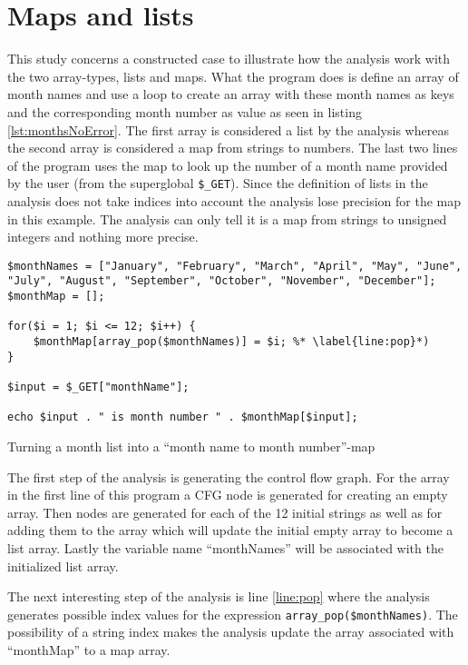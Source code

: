 \section{Maps and lists}
This study concerns a constructed case to illustrate how the analysis work with the two array-types, lists and maps. What the program does is define an array of month names and use a loop to create an array with these month names as keys and the corresponding month number as value as seen in listing \ref{lst:monthsNoError}. The first array is considered a list by the analysis whereas the second array is considered a map from strings to numbers. The last two lines of the program uses the map to look up the number of a month name provided by the user (from the superglobal \texttt{\$\_GET}). Since the definition of lists in the analysis does not take indices into account the analysis lose precision for the map in this example. The analysis can only tell it is a map from strings to unsigned integers and nothing more precise.

\begin{program}
\begin{lstlisting}
$monthNames = ["January", "February", "March", "April", "May", "June", "July", "August", "September", "October", "November", "December"];
$monthMap = [];

for($i = 1; $i <= 12; $i++) {
	$monthMap[array_pop($monthNames)] = $i; %* \label{line:pop}*)
}

$input = $_GET["monthName"];

echo $input . " is month number " . $monthMap[$input];
\end{lstlisting}
\caption{Turning a month list into a ``month name to month number''-map}
\label{lst:monthsNoError}
\end{program}

The first step of the analysis is generating the control flow graph. For the array in the first line of this program a CFG node is generated for creating an empty array. Then nodes are generated for each of the 12 initial strings as well as for adding them to the array which will update the initial empty array to become a list array. Lastly the variable name ``monthNames'' will be associated with the initialized list array.

The next interesting step of the analysis is line \ref{line:pop} where the analysis generates possible index values for the expression \texttt{array\_pop(\$monthNames)}. The possibility of a string index makes the analysis update the array associated with ``monthMap'' to a map array.

